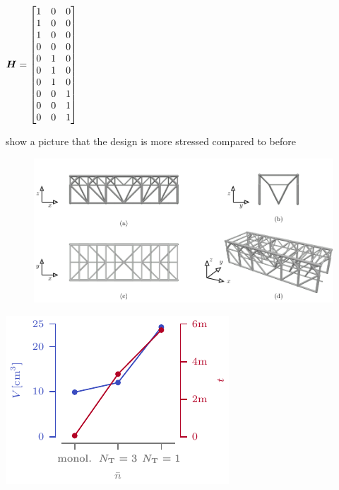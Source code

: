 $\bm{H}=
\begin{bmatrix}
    1 & 0 & 0\\
    1 & 0 & 0\\
    1 & 0 & 0\\
    0 & 0 & 0\\
    0 & 1 & 0\\
    0 & 1 & 0\\
    0 & 1 & 0\\
    0 & 0 & 1\\
    0 & 0 & 1\\
    0 & 0 & 1\\
\end{bmatrix}$

show a picture that the design is more stressed compared to before

\begin{figure}
    \centering
    \includegraphics{figures/05_cellular_opt/00_multiple_topology/support_sol.pdf}
    \caption{}
    \label{fig:05}
\end{figure}

\begin{marginfigure}
    \centering
    \includegraphics[width=\linewidth]{figures/05_cellular_opt/00_multiple_tab/multi_tab.pdf}
    \caption{}
    \label{fig:05}
\end{marginfigure}

